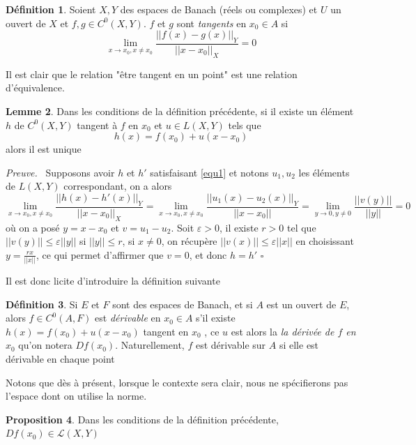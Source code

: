 \documentclass[a4paper,12pt,oneside,titlepage]{article}
\theoremstyle{definition}
\newtheorem{definition}{Définition}[section]
\newtheorem{proposition}[definition]{Proposition}
\newtheorem{lemme}[definition]{Lemme}
\theoremstyle{plain}
\newenvironment{preuve}
{\par\noindent\textit{Preuve.}\ }
{\hfill$\square$\par}
\begin{document}
\begin{definition}
Soient $X,Y$ des espaces de Banach (réels ou complexes) et $U$ un ouvert de $X$ et $f,g\in C^0(X,Y)$. $f$ et $g$ sont \textit{tangents} en $x_0\in A$ si 
\begin{equation*}
    \lim_{x\rightarrow{x_0},x\neq x_0}  \frac{||f(x)-g(x)||_Y}{||x-x_0||_X}=0
\end{equation*}
\end{definition}
Il est clair que le relation "être tangent en un point" est une relation d'équivalence.
\begin{lemme}
Dans les conditions de la définition précédente, si il existe un élément $h$ de $C^0(X,Y)$ tangent à $f$ en $x_0$ et  $u\in L(X,Y)$ tels que
\begin{equation}\label{equ1}
    h(x)=f(x_0)+u(x-x_0)
\end{equation}
alors il est unique
\end{lemme}
\begin{preuve}
   Supposons avoir $h$ et $h'$ satisfaisant \ref{equ1} et notons $u_1,u_2$ les éléments de $L(X,Y)$ correspondant, on a alors 
   \begin{equation*}
           \lim_{x\rightarrow{x_0},x\neq x_0}  \frac{||h(x)-h'(x)||_Y}{||x-x_0||_X}
           = \lim_{x\rightarrow{x_0},x\neq x_0}  \frac{||u_1(x)-u_2(x)||_Y}{||x-x_0||}
           =           \lim_{y\rightarrow{0},y\neq 0}  \frac{||v(y)||}{||y||}=0
   \end{equation*}
   où on a posé $y=x-x_0$ et $v=u_1-u_2$. Soit $\varepsilon>0$, il existe $r>0$ tel que $||v(y)||\leq \varepsilon||y||$ si $||y||\leq r$, si $x\neq 0$, on récupère $||v(x)||\leq \varepsilon  ||x||$ en choisissant $y=\frac{r x}{||x||}$, ce qui permet d'affirmer que $v=0$, et donc $h=h'$
\end{preuve}
Il est donc licite d'introduire la définition suivante
\begin{definition}
    Si $E$ et $F$ sont des espaces de Banach, et si $A$ est un ouvert de $E$, alors $f\in C^0(A,F)$ est \textit{dérivable} en $x_0\in A$ s'il existe $h(x)=f(x_0)+u(x-x_0)$ tangent en $x_0$  , ce $u$ est alors la \textit{la dérivée de $f$ en $x_0$} qu'on notera $Df(x_0)$. Naturellement, $f$ est dérivable sur $A$ si elle est dérivable en chaque point
\end{definition}
Notons que dès à présent, lorsque le contexte sera clair, nous ne spécifierons pas l'espace dont on utilise la norme.
\begin{proposition}
    Dans les conditions de la définition précédente, $Df(x_0)\in \mathcal{L}(X,Y)$
\end{proposition}
\end{document}
